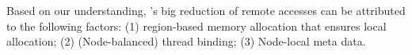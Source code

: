 Based on our understanding, \NM{}'s big reduction of remote accesses can be attributed to the following factors: (1) region-based memory allocation that ensures local allocation; (2) (Node-balanced) thread binding; (3) Node-local meta data. 

